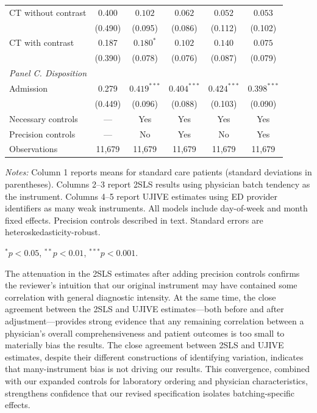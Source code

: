 \documentclass[11pt]{article}
\newcommand{\1}{\hbox{\rm 1\kern-.35em 1}}
\begin{document}
\begin{table}[t!]
\begin{threeparttable}
\begin{tabular}{lccccc}
CT without contrast 
& 0.400
& $0.102$ & $0.062$
& $0.052$ & $0.053$ \\
& (0.490)
& (0.095) & (0.086)
& (0.112) & (0.102) \\[0.5em]

CT with contrast 
& 0.187
& $0.180^{*}$ & $0.102$
& $0.140$ & $0.075$ \\
& (0.390)
& (0.078) & (0.076)
& (0.087) & (0.079) \\[0.5em]


\multicolumn{6}{l}{\textit{Panel C. Disposition}} \\[0.5em]

Admission 
& 0.279
& $0.419^{***}$ & $0.404^{***}$
& $0.424^{***}$ & $0.398^{***}$ \\
& (0.449)
& (0.096) & (0.088)
& (0.103) & (0.090) \\[0.5em]

\midrule
Necessary controls & --- & Yes & Yes & Yes & Yes \\
Precision controls & --- & No & Yes & No & Yes \\
Observations & 11,679 & 11,679 & 11,679 & 11,679 & 11,679 \\
\bottomrule
\end{tabular}

\begin{flushleft}
\footnotesize
\textit{Notes:} Column 1 reports means for standard care patients (standard deviations in parentheses). Columns 2–3 report 2SLS results using physician batch tendency as the instrument. Columns 4–5 report UJIVE estimates using ED provider identifiers as many weak instruments. All models include day-of-week and month fixed effects. Precision controls described in text. Standard errors are heteroskedasticity-robust.
\item $^{*} p < 0.05$, $^{**} p < 0.01$, $^{***} p < 0.001$.
\end{flushleft}

\end{threeparttable}
\end{table}

The attenuation in the 2SLS estimates after adding precision controls confirms the reviewer’s intuition that our original instrument may have contained some correlation with general diagnostic intensity. At the same time, the close agreement between the 2SLS and UJIVE estimates---both before and after adjustment---provides strong evidence that any remaining correlation between a physician’s overall comprehensiveness and patient outcomes is too small to materially bias the results. The close agreement between 2SLS and UJIVE estimates, despite their different constructions of identifying variation, indicates that many-instrument bias is not driving our results. This convergence, combined with our expanded controls for laboratory ordering and physician characteristics, strengthens confidence that our revised specification isolates batching-specific effects.
\end{document}
